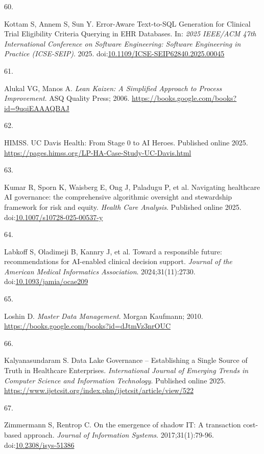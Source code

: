 \documentclass[
  american,
  11pt,
  letterpaper,
  oneside  ,captions=tableheading
]{scrartcl}
\newlength{\cslhangindent}
\newlength{\csllabelwidth}
\newenvironment{CSLReferences}[2] %
 {\begin{list}{}{%
  \setlength{\itemindent}{0pt}
  \setlength{\leftmargin}{0pt}
  \setlength{\parsep}{0pt}
  \ifodd #1
   \setlength{\leftmargin}{\cslhangindent}
   \setlength{\itemindent}{-1\cslhangindent}
  \fi
  \setlength{\itemsep}{#2\baselineskip}}}
 {\end{list}}
\newcommand{\CSLLeftMargin}[1]{\parbox[t]{\csllabelwidth}{\strut#1\strut}}
\newcommand{\CSLRightInline}[1]{\parbox[t]{\linewidth - \csllabelwidth}{\strut#1\strut}}
\begin{document}
\begin{CSLReferences}{0}{1}
\CSLLeftMargin{60. }%
\CSLRightInline{Kottam S, Annem S, Sun Y. {Error-Aware Text-to-SQL
Generation for Clinical Trial Eligibility Criteria Querying in EHR
Databases}. In: \emph{2025 IEEE/ACM 47th International Conference on
Software Engineering: Software Engineering in Practice (ICSE-SEIP)}.
2025.
doi:\href{https://doi.org/10.1109/ICSE-SEIP62840.2025.00045}{10.1109/ICSE-SEIP62840.2025.00045}}

\CSLLeftMargin{61. }%
\CSLRightInline{Alukal VG, Manos A. \emph{Lean Kaizen: A Simplified
Approach to Process Improvement}. ASQ Quality Press; 2006.
\url{https://books.google.com/books?id=9uqiEAAAQBAJ}}

\CSLLeftMargin{62. }%
\CSLRightInline{HIMSS. {UC Davis Health: From Stage 0 to AI Heroes}.
Published online 2025.
\url{https://pages.himss.org/LP-HA-Case-Study-UC-Davis.html}}

\CSLLeftMargin{63. }%
\CSLRightInline{{Kumar R, Sporn K, Waisberg E, Ong J, Paladugu P, et
al.} {Navigating healthcare AI governance: the comprehensive algorithmic
oversight and stewardship framework for risk and equity}. \emph{Health
Care Analysis}. Published online 2025.
doi:\href{https://doi.org/10.1007/s10728-025-00537-y}{10.1007/s10728-025-00537-y}}

\CSLLeftMargin{64. }%
\CSLRightInline{{Labkoff S, Oladimeji B, Kannry J, et al.} {Toward a
responsible future: recommendations for AI-enabled clinical decision
support}. \emph{Journal of the American Medical Informatics
Association}. 2024;31(11):2730.
doi:\href{https://doi.org/10.1093/jamia/ocae209}{10.1093/jamia/ocae209}}

\CSLLeftMargin{65. }%
\CSLRightInline{Loshin D. \emph{{Master Data Management}}. Morgan
Kaufmann; 2010. \url{https://books.google.com/books?id=dJtmVz3nrOUC}}

\CSLLeftMargin{66. }%
\CSLRightInline{Kalyanasundaram S. {Data Lake Governance -- Establishing
a Single Source of Truth in Healthcare Enterprises}. \emph{International
Journal of Emerging Trends in Computer Science and Information
Technology}. Published online 2025.
\url{https://www.ijetcsit.org/index.php/ijetcsit/article/view/522}}

\CSLLeftMargin{67. }%
\CSLRightInline{Zimmermann S, Rentrop C. {On the emergence of shadow IT:
A transaction cost-based approach}. \emph{Journal of Information
Systems}. 2017;31(1):79-96.
doi:\href{https://doi.org/10.2308/isys-51386}{10.2308/isys-51386}}


\end{CSLReferences}
\end{document}
